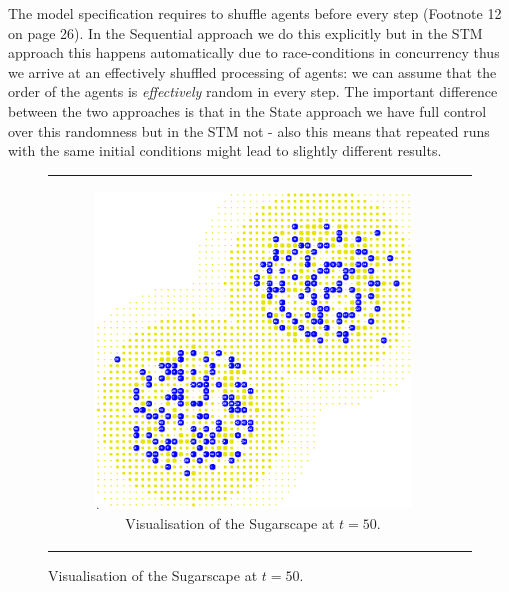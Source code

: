 The model specification requires to shuffle agents before every step (Footnote 12 on page 26). In the Sequential approach we do this explicitly but in the STM approach this happens automatically due to race-conditions in concurrency thus we arrive at an effectively shuffled processing of agents: we can assume that the order of the agents is \textit{effectively} random in every step. The important difference between the two approaches is that in the State approach we have full control over this randomness but in the STM not - also this means that repeated runs with the same initial conditions might lead to slightly different results.

\begin{figure}
\begin{center}
	\begin{tabular}{c c}
		\begin{subfigure}[b]{0.4\textwidth}
			\centering
			\includegraphics[width=1\textwidth, angle=0]{./fig/sugarscape/vis/sugarscape_t60_environment.png}
			\caption{Visualisation of the Sugarscape at $t = 50$.}
			\label{fig:vis_sugarscape_t50_environment}
		\end{subfigure}
    	
    	&
  

\end{tabular}
\end{center}
\end{figure}
